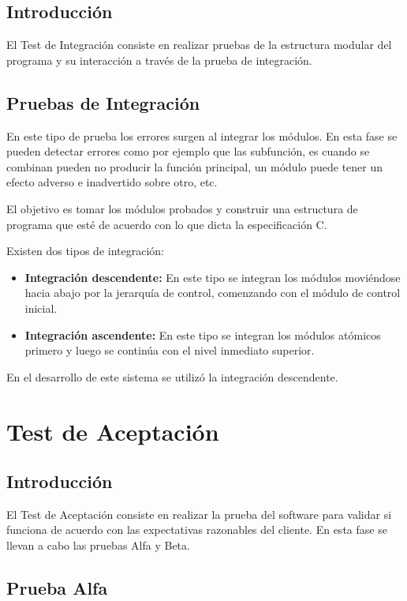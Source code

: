 	\subsection{Introducción}

		El Test de Integración consiste en realizar pruebas de la estructura modular del programa y su interacción a través de la prueba de integración.

	\subsection{Pruebas de Integración}

		En este tipo de prueba los errores surgen al integrar los módulos. En esta fase se pueden detectar errores como por ejemplo que las subfunción, es cuando se combinan pueden no producir la función principal, un módulo puede tener un efecto adverso e inadvertido sobre otro, etc.

		El objetivo es tomar los módulos probados y construir una estructura de programa que esté de acuerdo con lo que dicta la especificación C.
			
		Existen dos tipos de integración:
			\begin{itemize}
				\item \textbf{Integración descendente:} En este tipo se integran los módulos moviéndose hacia abajo por la jerarquía de control, comenzando con el módulo de control inicial.
				\item \textbf{Integración ascendente:} En este tipo se integran los módulos atómicos primero y luego se continúa con el nivel inmediato superior.
			\end{itemize}

	En el desarrollo de este sistema se utilizó la integración descendente.

\section{Test de Aceptación}

	\subsection{Introducción}

		El Test de Aceptación consiste en realizar la prueba del software para validar si funciona de acuerdo con las expectativas razonables del cliente. En esta fase se llevan a cabo las pruebas Alfa y Beta.

	\subsection{Prueba Alfa}

